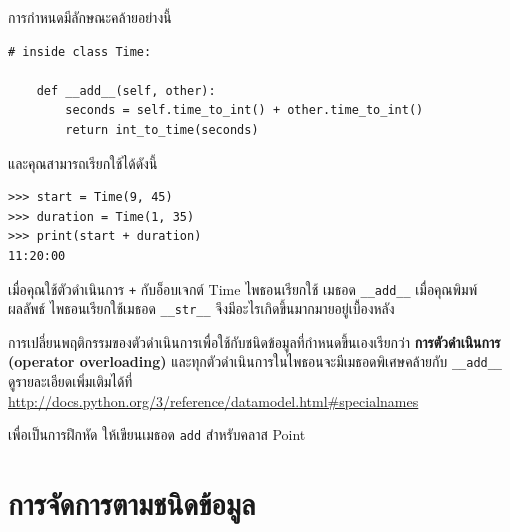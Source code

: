 
การกำหนดมีลักษณะคล้ายอย่างนี้

\begin{verbatim}
# inside class Time:

    def __add__(self, other):
        seconds = self.time_to_int() + other.time_to_int()
        return int_to_time(seconds)
\end{verbatim}
%

และคุณสามารถเรียกใช้ได้ดังนี้

\begin{verbatim}
>>> start = Time(9, 45)
>>> duration = Time(1, 35)
>>> print(start + duration)
11:20:00
\end{verbatim}
%

เมื่อคุณใช้ตัวดำเนินการ {\tt +} กับอ็อบเจกต์ Time ไพธอนเรียกใช้ เมธอด \verb"__add__"
เมื่อคุณพิมพ์ผลลัพธ์ ไพธอนเรียกใช้เมธอด \verb"__str__" จึงมีอะไรเกิดขึ้นมากมายอยู่เบื้องหลัง


การเปลี่ยนพฤติกรรมของตัวดำเนินการเพื่อใช้กับชนิดข้อมูลที่กำหนดขึ้นเองเรียกว่า {\bf การตัวดำเนินการ (operator overloading)}
และทุกตัวดำเนินการในไพธอนจะมีเมธอดพิเศษคล้ายกับ \verb"__add__" ดูรายละเอียดเพิ่มเติมได้ที่ 
\url{http://docs.python.org/3/reference/datamodel.html#specialnames}



เพื่อเป็นการฝึกหัด ให้เขียนเมธอด {\tt add} สำหรับคลาส Point

\section{การจัดการตามชนิดข้อมูล} %

